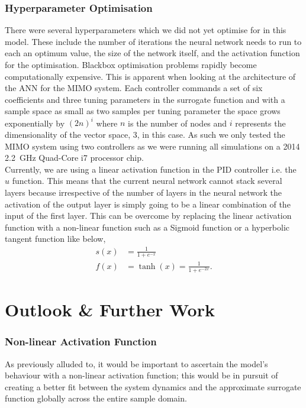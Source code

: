 \documentclass[conference]{IEEEtran}
\theoremstyle{definition}
\begin{document}
\subsubsection{Hyperparameter Optimisation}
There were several hyperparameters which we did not yet optimise for in this model. These include the number of iterations the neural network needs to run to each an optimum value, the size of the network itself, and the activation function for the optimisation. Blackbox optimisation problems rapidly become computationally expensive. This is apparent when looking at the architecture of the ANN for the MIMO system. Each controller commands a set of six coefficients and three tuning parameters in the surrogate function and with a sample space as small as two samples per tuning parameter the space grows exponentially by $(2n)^i$ where $n$ is the number of nodes and $i$ represents the dimensionality of the vector space, 3, in this case. As such we only tested the MIMO system using two controllers as we were running all simulations on a 2014 \SI{2.2}{GHz} Quad-Core i7 processor chip. \\
Currently, we are using a linear activation function in the PID controller i.e. the $u$ function. This means that the current neural network cannot stack several layers because irrespective of the number of layers in the neural network the activation of the output layer is simply going to be a linear combination of the input of the first layer. This can be overcome by replacing the linear activation function with a non-linear function such as a Sigmoid function or a hyperbolic tangent function like below, 
\begin{align}
    s(x) &= \frac{1}{1 + e^{-x}} \\
    f(x) &= \tanh(x) = \frac{1}{1+e^{-2x}}.
    \end{align}
\section{Outlook \& Further Work}
\subsubsection{Non-linear Activation Function}
As previously alluded to, it would be important to ascertain the model's behaviour with a non-linear activation function; this would be in pursuit of creating a better fit between the system dynamics and the approximate surrogate function globally across the entire sample domain.
\vspace{3mm}
\end{document}
